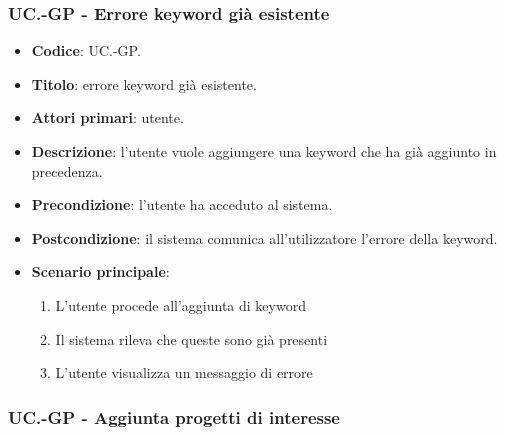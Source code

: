 	\subsubsection{UC\theuccount.\thesubuccount-GP - Errore keyword già esistente}

	\begin{itemize}
		\item \textbf{Codice}: UC\theuccount.\thesubuccount-GP.
		\item \textbf{Titolo}: errore keyword già esistente.
		\item \textbf{Attori primari}: utente.
		\item \textbf{Descrizione}: l'utente vuole aggiungere una keyword che ha già aggiunto in precedenza.
		\item \textbf{Precondizione}:  l’utente ha acceduto al sistema.
		\item \textbf{Postcondizione}: il sistema comunica all’utilizzatore l’errore della keyword.
		\item \textbf{Scenario principale}:
		\begin{enumerate}
			\item L'utente procede all'aggiunta di keyword
			\item Il sistema rileva che queste sono già presenti
			\item L'utente visualizza un messaggio di errore
		\end{enumerate}
	\end{itemize}

    \subsubsection{UC\theuccount.\thesubuccount-GP - Aggiunta progetti di interesse}
    
